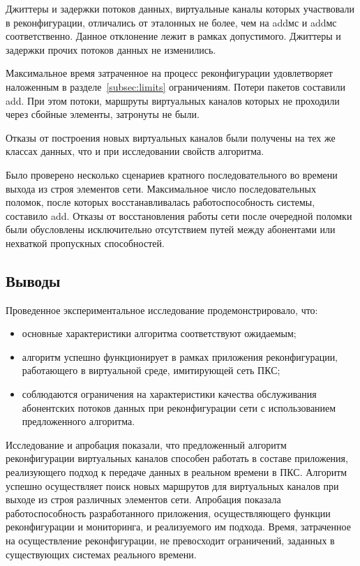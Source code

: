 \documentclass[12pt, a4paper]{article}
\begin{document}
Джиттеры и задержки потоков данных, виртуальные каналы которых участвовали в реконфигурации, отличались от эталонных не более, чем на addмс и addмс соответственно. Данное отклонение лежит в рамках допустимого. Джиттеры и задержки прочих потоков данных не изменились.

Максимальное время затраченное на процесс реконфигурации удовлетворяет наложенным в разделе~\ref{subsec:limits} ограничениям. Потери пакетов составили add. При этом потоки, маршруты виртуальных каналов которых не проходили через сбойные элементы, затронуты не были.

Отказы от построения новых виртуальных каналов были получены на тех же классах данных, что и при исследовании свойств алгоритма.

Было проверено несколько сценариев кратного последовательного во времени выхода из строя элементов сети. Максимальное число последовательных поломок, после которых восстанавливалась работоспособность системы, составило add. Отказы от восстановления работы сети после очередной поломки были обусловлены исключительно отсутствием путей между абонентами или нехваткой пропускных способностей.

\subsection{Выводы}
Проведенное экспериментальное исследование продемонстрировало, что:
\begin{itemize}
	\item основные характеристики алгоритма соответствуют ожидаемым;
	\item алгоритм успешно функционирует в рамках приложения реконфигурации, работающего в виртуальной среде, имитирующей сеть ПКС;
	\item соблюдаются ограничения на характеристики качества обслуживания абонентских потоков данных при реконфигурации сети с использованием предложенного алгоритма.
\end{itemize}

Исследование и апробация показали, что предложенный алгоритм реконфигурации виртуальных каналов способен работать в составе приложения, реализующего подход к передаче данных в реальном времени в ПКС. Алгоритм успешно осуществляет поиск новых маршрутов для виртуальных каналов при выходе из строя различных элементов сети. Апробация показала работоспособность разработанного приложения, осуществляющего функции реконфигурации и мониторинга, и реализуемого им подхода. Время, затраченное на осуществление реконфигурации, не превосходит ограничений, заданных в существующих системах реального времени.
\end{document}
